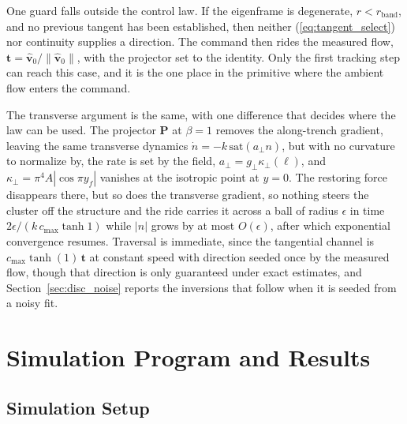 \documentclass[lettersize,journal]{IEEEtran}
\begin{document}
One guard falls outside the control law. If the eigenframe is
degenerate, $r < r_{\mathrm{band}}$, and no previous tangent has been
established, then neither (\ref{eq:tangent_select}) nor continuity
supplies a direction. The command then rides the measured flow,
$\mathbf{t} = \hat{\mathbf{v}}_0/\|\hat{\mathbf{v}}_0\|$, with the
projector set to the identity. Only the first tracking step can reach
this case, and it is the one place in the primitive where the ambient
flow enters the command.

The transverse argument is the same, with one difference that decides
where the law can be used. The projector $\mathbf{P}$ at $\beta = 1$
removes the along-trench gradient, leaving the same transverse dynamics
$\dot{n} = -k\,\mathrm{sat}(a_\perp n)$, but with no curvature to
normalize by, the rate is set by the field, $a_\perp = g_\perp
\kappa_\perp(\ell)$, and $\kappa_\perp = \pi^4 A|\cos \pi y_f|$ vanishes
at the isotropic point at $y = 0$. The restoring force
disappears there, but so does the transverse gradient, so nothing steers
the cluster off the structure and the ride carries it across a ball of
radius $\epsilon$ in time $2\epsilon/(k\,c_{\max}\tanh 1)$ while $|n|$
grows by at most $O(\epsilon)$, after which exponential convergence
resumes. Traversal is immediate, since the tangential channel is
$c_{\max}\tanh(1)\,\mathbf{t}$ at constant speed with direction seeded
once by the measured flow, though that direction is only guaranteed
under exact estimates, and Section~\ref{sec:disc_noise} reports the
inversions that follow when it is seeded from a noisy fit.

\section{Simulation Program and Results}

\subsection{Simulation Setup}
\end{document}
